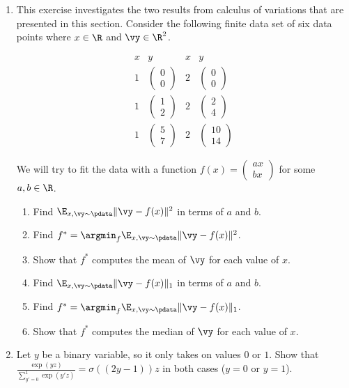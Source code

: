 \documentclass{article}
\newcommand{\twovector}[2]{ \begin{smallmatrix} #1 \\ #2 \end{smallmatrix} }
\newcommand{\ptwovector}[2]{ \left( \twovector{#1}{#2} \right) }
\begin{document}
\begin{enumerate}

\item \label{DFN_ex_calculusofvariations} 
This exercise investigates the two results from calculus of variations that are presented in this section. Consider the following finite data set of six data points where $x \in \R$ and $\vy \in \R^2$.

\begin{equation*}
\begin{array}{c|c||c|c}
    x & y & x & y \\
    \hline
    \hline
    1 & \ptwovector00 & 2 & \ptwovector00 \\
    \hline
    1 & \ptwovector12 & 2 & \ptwovector24 \\
    \hline
    1 & \ptwovector57 & 2 & \ptwovector{10}{14}
\end{array}
\end{equation*}

We will try to fit the data with a function $f(x) = \ptwovector{ax}{bx}$ for some $a, b \in \R$.

\begin{enumerate}
    \item Find $\E_{x,\vy\sim\pdata}\lVert \vy - f(x)\rVert^2$ in terms of $a$ and $b$.
    \item Find $f^* = \argmin_f \E_{x,\vy\sim\pdata}\lVert \vy - f(x)\rVert^2$.
    \item Show that $f^*$ computes the mean of $\vy$ for each value of $x$.
    \item Find $\E_{x,\vy\sim\pdata}\lVert \vy - f(x)\rVert_1$ in terms of $a$ and $b$.
    \item Find $f^* = \argmin_f \E_{x,\vy\sim\pdata}\lVert \vy - f(x)\rVert_1$.
    \item Show that $f^*$ computes the median of $\vy$ for each value of $x$.
\end{enumerate}

\item \label{DFN_ex_bernoulli} 
Let $y$ be a binary variable, so it only takes on values $0$ or $1$. Show that $\frac{\exp(yz)}{\sum_{y' = 0}^1 \exp(y'z)} = \sigma((2y-1))z$ in both cases ($y = 0$ or $y = 1$).  


\end{enumerate}
\end{document}
